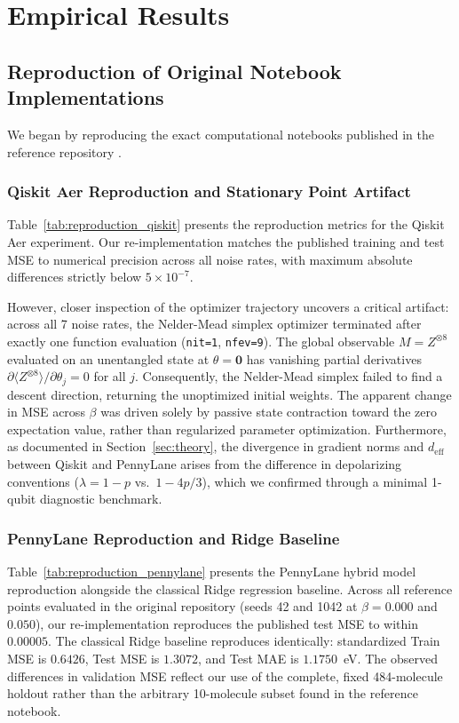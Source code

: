 \documentclass[sn-apacite,Numbered]{sn-jnl}
\begin{document}
\section{Empirical Results}\label{sec:results}

\subsection{Reproduction of Original Notebook Implementations}

We began by reproducing the exact computational notebooks published in the reference repository \cite{fnqgnnmd_repo}.

\subsubsection{Qiskit Aer Reproduction and Stationary Point Artifact}
Table~\ref{tab:reproduction_qiskit} presents the reproduction metrics for the Qiskit Aer experiment.
Our re-implementation matches the published training and test MSE to numerical precision across all noise rates, with maximum absolute differences strictly below $5 \times 10^{-7}$. 



However, closer inspection of the optimizer trajectory uncovers a critical artifact: across all 7 noise rates, the Nelder-Mead simplex optimizer terminated after exactly one function evaluation (\texttt{nit=1}, \texttt{nfev=9}). The global observable $M = Z^{\otimes 8}$ evaluated on an unentangled state at $\theta = \mathbf{0}$ has vanishing partial derivatives $\partial \langle Z^{\otimes 8} \rangle / \partial \theta_j = 0$ for all $j$. Consequently, the Nelder-Mead simplex failed to find a descent direction, returning the unoptimized initial weights. The apparent change in MSE across $\beta$ was driven solely by passive state contraction toward the zero expectation value, rather than regularized parameter optimization. Furthermore, as documented in Section~\ref{sec:theory}, the divergence in gradient norms and $d_{\text{eff}}$ between Qiskit and PennyLane arises from the difference in depolarizing conventions ($\lambda = 1-p$ vs.\ $1-4p/3$), which we confirmed through a minimal 1-qubit diagnostic benchmark.

\subsubsection{PennyLane Reproduction and Ridge Baseline}
Table~\ref{tab:reproduction_pennylane} presents the PennyLane hybrid model reproduction alongside the classical Ridge regression baseline.
Across all reference points evaluated in the original repository (seeds 42 and 1042 at $\beta=0.000$ and $0.050$), our re-implementation reproduces the published test MSE to within $0.00005$. 
The classical Ridge baseline reproduces identically: standardized Train MSE is $0.6426$, Test MSE is $1.3072$, and Test MAE is $1.1750$~eV. The observed differences in validation MSE reflect our use of the complete, fixed 484-molecule holdout rather than the arbitrary 10-molecule subset found in the reference notebook.
\end{document}
